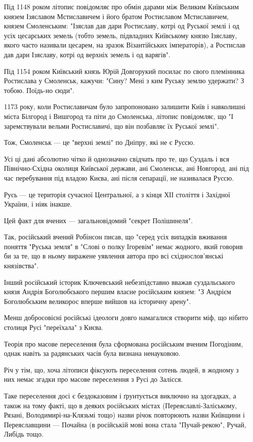 Під 1148 роком літопис повідомляє про обмін дарами між Великим Київським князем
Ізяславом Мстиславичем і його братом Ростиславом Мстиславичем, князем
Смоленським: "Ізяслав дав дари Ростиславу, котрі од Руської землі і од усіх
цесарських земель (тобто земель, підвладних Київському князю Ізяславу, якого
часто називали цесарем, на зразок Візантійських імператорів), а Ростислав дав
дари Ізяславу, котрі од верхніх земель і од варягів".

Під 1154 роком Київський князь Юрій Довгорукий посилає по свого племінника
Ростислава у Смоленськ, кажучи: "Сину? Мені з ким Руську землю удержати? З
тобою. Поїдь-но сюди".

1173 року, коли Ростиславичам було запропоновано залишити Київ і навколишні
міста Білгород і Вишгород та піти до Смоленська, літопис повідомляє, що "І
заремствували вельми Ростиславичі, що він позбавляє їх Руської землі".

Тож, Смоленськ --- це "верхні землі" по Дніпру, які не є Руссю.

Усі ці дані абсолютно чітко й однозначно свідчать про те, що Суздаль і вся
Північно-Східна околиця Київської держави, ані Смоленськ, ані Новгород, ані під
час перебування під владою Києва, ані після сепарації, не називалася Руссю.

Русь --- це територія сучасної Центральної, а з кінця ХІІ століття і Західної
України, і ніяк інакше.

Цей факт для вчених --- загальновідомий "секрет Полішинеля".

Так, російський вчений Робінсон писав, що "серед усіх випадків вживання поняття
"Руська земля" в "Слові о полку Ігоревім" немає жодного, який говорив би за те,
що в ньому виражене уявлення автора про всі східнослов'янські князівства".

Інший російський історик Ключевський небезпідставно вважав суздальського князя
Андрія Боголюбського першим власне російським князем: "З Андрієм Боголюбським
великорос вперше вийшов на історичну арену".

Менш добросовісні російські ідеологи довго намагалися створити міф, що нібито
столиця Русі "переїхала" з Києва.

Теорія про масове переселення була сформована російським вченим Погодіним,
однак навіть за радянських часів була визнана ненауковою.

Річ у тім, що, хоча літописи фіксують переселення сотень людей, в жодному з них
немає згадки про масове переселення з Русі до Залісся.

Таке переселення досі є бездоказовим і ґрунтується виключно на здогадках, а
також на тому факті, що в деяких російських містах (Переяславлі-Заліському,
Рязані, Володимирі-на-Клязьмі тощо) назви річок повторюють назви Київщини і
Переяславщини --- Почайна (в російській мові вона стала "Пучай-рекою", Ручай,
Либідь тощо.

